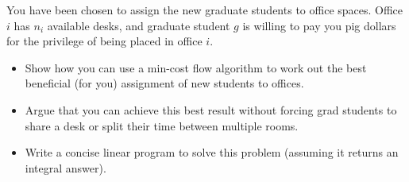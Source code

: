 \documentclass{article}
\newcounter{exercise}
\newcommand{\<}{
    \langle}
\renewcommand{\>}{
    \rangle}
\begin{document}
{\begin{exercise}
You have been chosen to assign the new graduate students to office spaces. Office $i$ has $n_i$ available desks, and graduate student
$g$ is willing to pay you pig dollars for the privilege of being placed in office $i$.

\begin{itemize}
    \item Show how you can use a min-cost flow algorithm to work out the best beneficial (for you) assignment of new students to offices.
    \item Argue that you can achieve this best result without forcing grad students to share
a desk or split their time between multiple rooms.
    \item Write a concise linear program to solve this problem (assuming it returns an
integral answer).
\end{itemize}


\end{exercise}}
\end{document}
